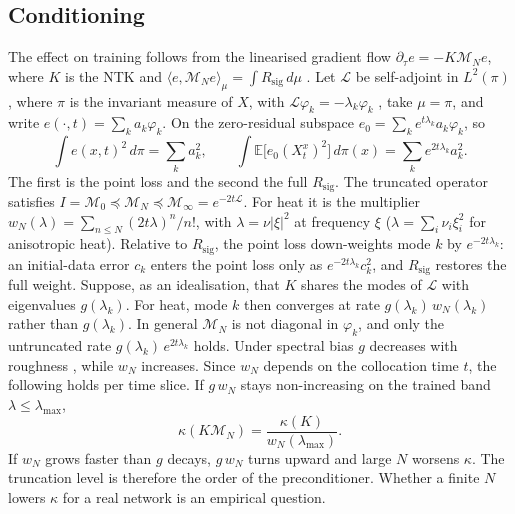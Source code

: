 \documentclass[english]{article}
\begin{document}
\subsection{Conditioning}\label{sec:conditioning}
The effect on training follows from the linearised gradient flow $\partial_\tau  e = -K\mathcal M_N e$, where $K$ is the NTK \cite{jacot2018ntk} and $\langle e,\mathcal M_N e\rangle_\mu = \int R_\mathrm{sig}\,d\mu$ \cite{deryck2024operator}. Let $\mathcal L$ be self-adjoint in $L^2(\pi)$, where $\pi$ is the invariant measure of $X$, with $\mathcal L\varphi_k = -\lambda_k\varphi_k$ \cite{bakry2014analysis}, take $\mu = \pi$, and write $e(\cdot,t) = \sum_k a_k\varphi_k$. On the zero-residual subspace $e_0 = \sum_k e^{t\lambda_k}a_k\varphi_k$, so
\begin{equation}\label{eq:modes}   \int e(x,t)^2\,d\pi = \sum_k a_k^2,   \qquad   \int \mathbb E\big[e_0(X^x_t)^2\big]\,d\pi(x) = \sum_k e^{2t\lambda_k}a_k^2 .
\end{equation}
The first is the point loss and the second the full $R_\mathrm{sig}$. The truncated operator satisfies $I = \mathcal M_0 \preceq \mathcal M_N \preceq \mathcal M_\infty = e^{-2t\mathcal L}$. For heat it is the multiplier $w_N(\lambda) = \sum_{n\le N}(2t\lambda)^n/n!$, with $\lambda = \nu|\xi|^2$ at frequency $\xi$ ($\lambda=\sum_i\nu_i\xi_i^2$ for anisotropic heat). Relative to $R_\mathrm{sig}$, the point loss down-weights mode $k$ by $e^{-2t\lambda_k}$: an initial-data error $c_k$ enters the point loss only as $e^{-2t\lambda_k}c_k^2$, and $R_\mathrm{sig}$ restores the full weight. Suppose, as an idealisation, that $K$ shares the modes of $\mathcal L$ with eigenvalues $g(\lambda_k)$. For heat, mode $k$ then converges at rate $g(\lambda_k)\,w_N(\lambda_k)$ rather than $g(\lambda_k)$. In general $\mathcal M_N$ is not diagonal in $\varphi_k$, and only the untruncated rate $g(\lambda_k)\,e^{2t\lambda_k}$ holds. Under spectral bias $g$ decreases with roughness \cite{rahaman2019spectral,wang2022ntk}, while $w_N$ increases. Since $w_N$ depends on the collocation time $t$, the following holds per time slice. If $g\,w_N$ stays non-increasing on the trained band $\lambda\le\lambda_{\max}$,
\begin{equation}\label{eq:kappa}
\kappa(K\mathcal M_N) = \frac{\kappa(K)}{w_N(\lambda_{\max})} .
\end{equation}
If $w_N$ grows faster than $g$ decays, $g\,w_N$ turns upward and large $N$ worsens $\kappa$. The truncation level is therefore the order of the preconditioner. Whether a finite $N$ lowers $\kappa$ for a real network is an empirical question.
\end{document}
